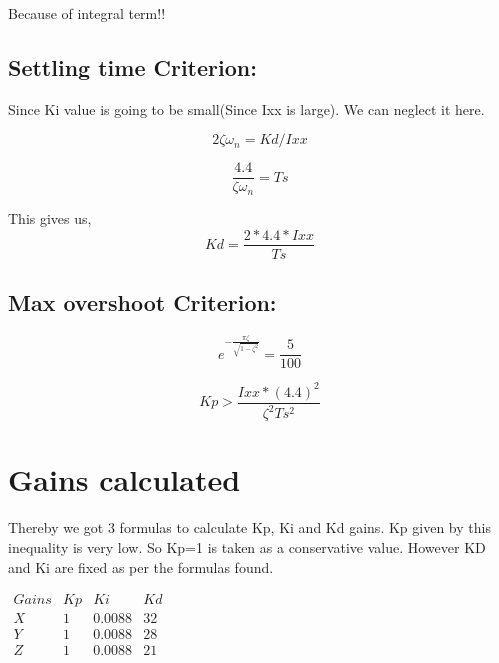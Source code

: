 \documentclass[10pt,a4paper]{report}
\begin{document}
Because of integral term!!

\subsection{Settling time Criterion:}

Since Ki value is going to be small(Since Ixx is large). We can neglect
it here.

\[
2\zeta\omega_{n}=Kd/Ixx
\]

\[
\frac{4.4}{\zeta\omega_{n}}=Ts
\]

This gives us,\textbf{
	\[
	Kd=\frac{2*4.4*Ixx}{Ts}
	\]
}

\subsection{Max overshoot Criterion:}


\[
e^{-\frac{\pi\zeta}{\sqrt{1-\zeta^{2}}}}=\frac{5}{100}
\]

\[
Kp>\frac{Ixx*(4.4)^{2}}{\zeta^{2}Ts^{2}}
\]
\section{Gains calculated}
Thereby we got 3 formulas to calculate Kp, Ki and Kd gains. Kp given
by this inequality is very low. So Kp=1 is taken as a conservative
value. However KD and Ki are fixed as per the formulas found.
\begin{center}
	$\begin{array}{cccc}
	Gains & Kp & Ki & Kd\\
	X & 1 & 0.0088 & 32\\
	Y & 1 & 0.0088 & 28\\
	Z & 1 & 0.0088 & 21
	\end{array}$
	\par\end{center}
\end{document}

